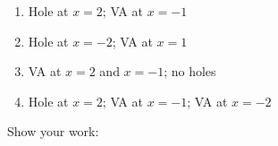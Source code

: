 \documentclass[10pt]{article}
\begin{document}
\begin{enumerate}[itemsep=18pt]
      \medskip
      \begin{enumerate}[label=(\Alph*), itemsep=4pt]
        \item Hole at $x = 2$; VA at $x = -1$
        \item Hole at $x = -2$; VA at $x = 1$
        \item VA at $x = 2$ and $x = -1$; no holes
        \item Hole at $x = 2$; VA at $x = -1$; VA at $x = -2$
      \end{enumerate}

      \vspace{0.06in}
      \leavevmode{}\phantom{Answer:} \gradedblank[id=hw5, type=choice, points=1, answer=A]{1.5cm}{13pt} \quad Show your work:

      \vspace{0.08in}

\end{enumerate}
\end{document}

